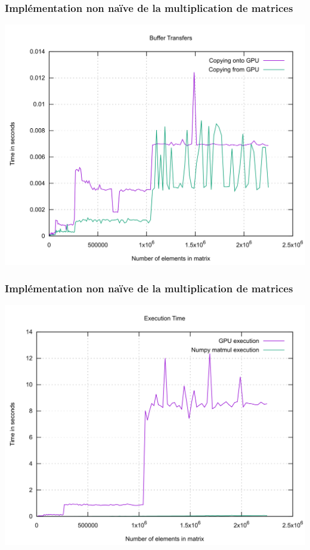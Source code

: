 \begin{frame}
    \frametitle{Implémentation non naïve de la multiplication de matrices}
    \includegraphics[width=\textwidth]{../resources/buffer_transfer.png}
\end{frame}

\begin{frame}
    \frametitle{Implémentation non naïve de la multiplication de matrices}
    \includegraphics[width=\textwidth]{../resources/execution_time.png}
\end{frame}


